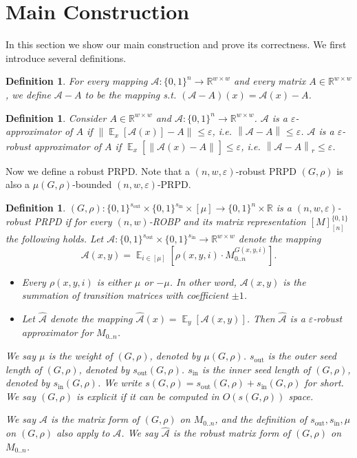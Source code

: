 \documentclass[10pt,a4paper]{article}
\newtheorem{definition}[theorem]{Definition}
\DeclareMathOperator*{\Ex}{\mathbb E}
\newcommand{\ex}[2][]{\Ex_{#1}\left[#2\right]}
\newcommand{\norm}[2][]{\left\|#2\right\|_{#1}}
\newcommand{\bbR}{\mathbb R}
\newcommand{\cA}{\mathcal A}
\newcommand{\bits}[1]{\{0,1\}^{#1}}
\newcommand{\bit}{\{0,1\}}
\newcommand{\eps}{\varepsilon}
\newcommand{\wt}{\mu}
\newcommand{\sout}[1][]{s_{\mathrm{out}#1}}
\newcommand{\si}[1][]{s_{\mathrm{in}#1}}
\begin{document}
\section{Main Construction}\label{sec:main-construction}
In this section we show our main construction and prove its correctness. We first introduce several definitions.
\begin{definition}
For every mapping $\cA:\bits{n}\to\bbR^{w\times w}$ and every matrix $A\in\bbR^{w\times w}$, we define $\cA-A$ to be the mapping s.t. $(\cA-A)(x)=\cA(x)-A$.
\end{definition}
\begin{definition}
Consider $A\in\bbR^{w\times w}$ and $\cA:\bits{n}\to\bbR^{w\times w}$. $\cA$ is a $\eps$-\emph{approximator} of $A$ if $\norm{\ex[x]{\cA(x)}-A}\le \eps$, i.e. $\norm{\cA-A}\le \eps$. $\cA$ is a $\eps$-\emph{robust approximator} of $A$ if $\ex[x]{\norm{\cA(x)-A}}\le \eps$, i.e. $\norm[r]{\cA-A}\le \eps$.
\end{definition}
\noindent
Now we define a robust PRPD. Note that a $(n,w,\eps)$-robust PRPD $(G,\rho)$ is also a $\wt(G,\rho)$-bounded $(n,w,\eps)$-PRPD.
\begin{definition}\label{def:robust-PRPD}
$(G,\rho):\bits{\sout}\times\bits{\si}\times{[\wt]}\to\bits{n}\times\bbR$ is a $(n,w,\eps)$-\emph{robust PRPD} if for every $(n,w)$-ROBP and its matrix representation $[M]_{[n]}^{\bit}$ the following holds. Let $\cA:\bits{\sout}\times\bits{\si}\to\bbR^{w\times w}$ denote the mapping 
$$\cA(x,y)=\ex[i\in {[\wt]}]{\rho(x,y,i)\cdot M_{0..n}^{G(x,y,i)}}.$$
\begin{itemize}
\item
Every $\rho(x,y,i)$ is either $\wt$ or $-\wt$. In other word, $\cA(x,y)$ is the summation of transition matrices with coefficient $\pm 1$.
\item
Let $\widehat{\cA}$ denote the mapping $\widehat{\cA}(x)=\ex[y]{\cA(x,y)}$. Then $\widehat{\cA}$ is a $\eps$-robust approximator for $M_{0..n}$. 
\end{itemize}
We say $\wt$ is the weight of $(G,\rho)$, denoted by $\wt(G,\rho)$. $\sout$ is the \emph{outer seed length} of $(G,\rho)$, denoted by $\sout(G,\rho)$. $\si$ is the \emph{inner seed length} of $(G,\rho)$, denoted by $\si(G,\rho)$. We write $s(G,\rho)=\sout(G,\rho)+\si(G,\rho)$ for short. We say $(G,\rho)$ is explicit if it can be computed in $O(s(G,\rho))$ space.

We say $\cA$ is the \emph{matrix form} of $(G,\rho)$ on $M_{0..n}$, and the definition of $\sout,\si,\wt$ on $(G,\rho)$ also apply to $\cA$. We say $\widehat{\cA}$ is the \emph{robust matrix form} of $(G,\rho)$ on $M_{0..n}$. 
\end{definition}
\end{document}
